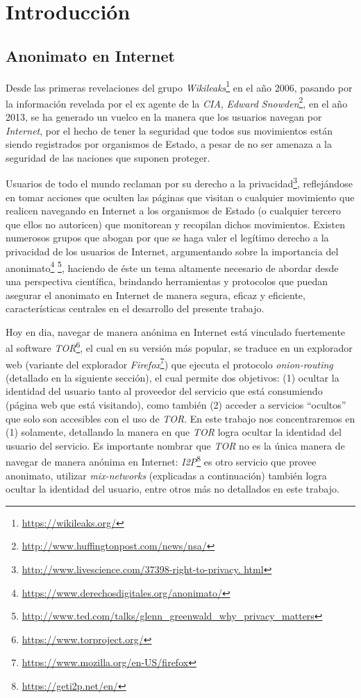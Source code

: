 \chapter{Introducción}
\section{Anonimato en Internet}

Desde las primeras revelaciones del grupo \emph{Wikileaks}\footnote{\url{https://wikileaks.org/}} en el año 2006, pasando por la información revelada por el ex agente de la \emph{CIA}, \emph{Edward Snowden}\footnote{\url{http://www.huffingtonpost.com/news/nsa/}}, en el año 2013, se ha generado un vuelco en la manera que los usuarios navegan por \emph{Internet}, por el hecho de tener la seguridad que todos sus movimientos están siendo registrados por organismos de Estado, a pesar de no ser amenaza a la seguridad de las naciones que suponen proteger.

Usuarios de todo el mundo reclaman por su derecho a la privacidad\footnote{\url{http://www.livescience.com/37398-right-to-privacy.
html}}, reflejándose en tomar acciones que oculten las páginas que visitan o cualquier movimiento que realicen navegando en Internet a los organismos de Estado (o cualquier tercero que ellos no autoricen) que monitorean y recopilan dichos movimientos. Existen numerosos grupos que abogan por que se haga valer el legítimo derecho a la privacidad de los usuarios de Internet, argumentando sobre la importancia del anonimato\footnote{\url{https://www.derechosdigitales.org/anonimato/}} \footnote{\url{http://www.ted.com/talks/glenn_greenwald_why_privacy_matters}}, haciendo de éste un tema altamente necesario de abordar desde una perspectiva científica, brindando herramientas y protocolos que puedan asegurar el anonimato en Internet de manera segura, eficaz y eficiente, características centrales en el desarrollo del presente trabajo.

Hoy en dia, navegar de manera anónima en Internet está vinculado fuertemente al software \emph{TOR}\footnote{\url{https://www.torproject.org/}}, el cual en su versión más popular, se traduce en un explorador web (variante del explorador \emph{Firefox}\footnote{\url{https://www.mozilla.org/en-US/firefox}}) que ejecuta el protocolo \emph{onion-routing} (detallado en la siguiente sección), el cual permite dos objetivos: (1) ocultar la identidad del usuario tanto al proveedor del servicio que está consumiendo (página web que está visitando), como también (2) acceder a servicios ``ocultos'' que solo son accesibles con el uso de \emph{TOR}. En este trabajo nos concentraremos en (1) solamente, detallando la manera en que \emph{TOR} logra ocultar la identidad del usuario del servicio. Es importante nombrar que \emph{TOR} no es la única manera de navegar de manera anónima en Internet: \emph{I2P}\footnote{\url{https://geti2p.net/en/}} es otro servicio que provee anonimato, utilizar \emph{mix-networks} (explicadas a continuación) también logra ocultar la identidad del usuario, entre otros más no detallados en este trabajo.

